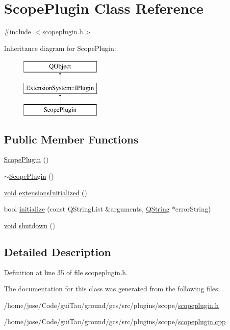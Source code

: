 \hypertarget{class_scope_plugin}{\section{Scope\-Plugin Class Reference}
\label{class_scope_plugin}
}


{\ttfamily \#include $<$scopeplugin.\-h$>$}

Inheritance diagram for Scope\-Plugin\-:\begin{figure}[H]
\begin{center}
\leavevmode
\includegraphics[height=3.000000cm]{class_scope_plugin}
\end{center}
\end{figure}
\subsection*{Public Member Functions}
\begin{DoxyCompactItemize}
\item 
\hyperlink{group___scope_plugin_ga199bf070e8b30f153774fed25c1bfb85}{Scope\-Plugin} ()
\item 
\hyperlink{group___scope_plugin_ga8c6b2fb4f5b848c5462148b93158ae5e}{$\sim$\-Scope\-Plugin} ()
\item 
\hyperlink{group___u_a_v_objects_plugin_ga444cf2ff3f0ecbe028adce838d373f5c}{void} \hyperlink{group___scope_plugin_ga92b5617116c8cbaa97c2f26bb2863ab3}{extensions\-Initialized} ()
\item 
bool \hyperlink{group___scope_plugin_gad49bcc2c25eda45814189ba82b8a1a5b}{initialize} (const Q\-String\-List \&arguments, \hyperlink{group___u_a_v_objects_plugin_gab9d252f49c333c94a72f97ce3105a32d}{Q\-String} $\ast$error\-String)
\item 
\hyperlink{group___u_a_v_objects_plugin_ga444cf2ff3f0ecbe028adce838d373f5c}{void} \hyperlink{group___scope_plugin_ga13799130d5adbbdc55c06e4597df6a08}{shutdown} ()
\end{DoxyCompactItemize}


\subsection{Detailed Description}


Definition at line 35 of file scopeplugin.\-h.



The documentation for this class was generated from the following files\-:\begin{DoxyCompactItemize}
\item 
/home/jose/\-Code/gui\-Tau/ground/gcs/src/plugins/scope/\hyperlink{scopeplugin_8h}{scopeplugin.\-h}\item 
/home/jose/\-Code/gui\-Tau/ground/gcs/src/plugins/scope/\hyperlink{scopeplugin_8cpp}{scopeplugin.\-cpp}\end{DoxyCompactItemize}
